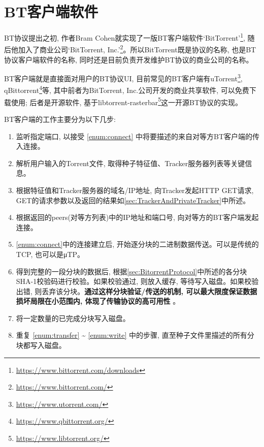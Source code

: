 \section{BT客户端软件}

BT协议提出之初, 作者Bram Cohen就实现了一版BT客户端软件`BitTorrent'\footnote{\url{https://www.bittorrent.com/downloads}}, 随后他加入了商业公司`BitTorrent, Inc.'\footnote{\url{https://www.bittorrent.com/}}。所以BitTorrent既是协议的名称, 也是BT协议客户端软件的名称, 同时还是目前负责开发维护BT协议的商业公司的名称。

BT客户端就是直接面对用户的BT协议UI, 目前常见的BT客户端有uTorrent\footnote{\url{https://www.utorrent.com/}}, qBittorrent\footnote{\url{https://www.qbittorrent.org/}}等, 其中前者为BitTorrent, Inc.公司开发的商业共享软件, 可以免费下载使用; 后者是开源软件, 基于libtorrent-rasterbar\footnote{\url{https://www.libtorrent.org/}}这一开源BT协议的实现。

BT客户端的工作主要分为以下几步:

\begin{enumerate}[label=(\arabic*),leftmargin=*]
\item 监听指定端口, 以接受 \ref{enum:connect} 中将要描述的来自对等方BT客户端的传入连接。

\item 解析用户输入的Torrent文件, 取得种子特征值、Tracker服务器列表等关键信息。

\item 根据特征值和Tracker服务器的域名/IP地址, 向Tracker发起HTTP GET请求, GET的请求参数以及返回的结果如\ref{sec:TrackerAndPrivateTracker}中所述。

\item \label{enum:connect}根据返回的peers(对等方列表)中的IP地址和端口号, 向对等方的BT客户端发起连接。

\item \label{enum:transfer} \ref{enum:connect}中的连接建立后, 开始逐分块的二进制数据传送。可以是传统的TCP, 也可以是μTP。

\item 得到完整的一段分块的数据后, 根据\ref{sec:BitorrentProtocol}中所述的各分块SHA-1校验码进行校验。如果校验通过, 则放入缓存, 等待写入磁盘。如果校验出错, 则丢弃该分块。\textbf{通过这样分块验证/传送的机制, 可以最大限度保证数据损坏局限在小范围内, 体现了传输协议的高可用性}
。

\item \label{enum:write}将一定数量的已完成分块写入磁盘。

\item 重复 \ref{enum:transfer} \~{} \ref{enum:write} 中的步骤, 直至种子文件里描述的所有分块都写入磁盘。
\end{enumerate}




